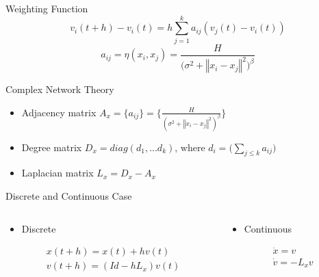 \documentclass{beamer}
\begin{document}
\begin{frame}{Weighting Function}
	\begin{equation}
		v_i(t+h)-v_i(t)=h\sum_{j=1}^k a_{ij}(v_j(t)-v_i(t))\nonumber
	\end{equation}
  \vspace{1cm}
	\begin{equation}
		a_{ij}=\eta(x_i,x_j)=\frac{H}{\big(\sigma^2+\left\Vert x_i - x_j \right\Vert^2\big)^{\beta}}\nonumber
	\end{equation}
\end{frame}
\begin{frame}{Complex Network Theory}
	\begin{itemize}
		\item Adjacency matrix $A_x = \lbrace a_{ij}\rbrace=\bigg\lbrace\frac{H}{(\sigma^2+\left\Vert x_i - x_j \right\Vert^2)^{\beta}}\bigg\rbrace\nonumber$
		\vspace{0.5cm}
		\item Degree matrix $D_x = diag(d_1,...d_k) \text{, where } d_i=\bigg(\sum_{j\leq k}a_{ij}\bigg)$
		\vspace{0.5cm}
		\item Laplacian matrix $L_x = D_x - A_x$
	\end{itemize}
\end{frame}
\begin{frame}{Discrete and Continuous Case}
	\begin{minipage}[0.95\textheight]{\textwidth}
	\begin{columns}[T]
	\begin{column}{0.5\textwidth}
		\begin{itemize}
		  \item Discrete
		  \vspace{0.5cm}
		\end{itemize}
		\begin{align}
			&x(t+h) = x(t) + hv(t)\nonumber\\
			&v(t+h) = (Id -hL_x)v(t)\nonumber
		\end{align}
	\end{column}
	\begin{column}{0.5\textwidth}
		\begin{itemize}
		  \item Continuous
		  \vspace{0.5cm}
		\end{itemize}
		\begin{align}
			&\dot{x} = v\nonumber\\
			&\dot{v} = -L_xv\nonumber
		\end{align}
	\end{column}
	\end{columns}
	\end{minipage}
\end{frame}
\end{document}
